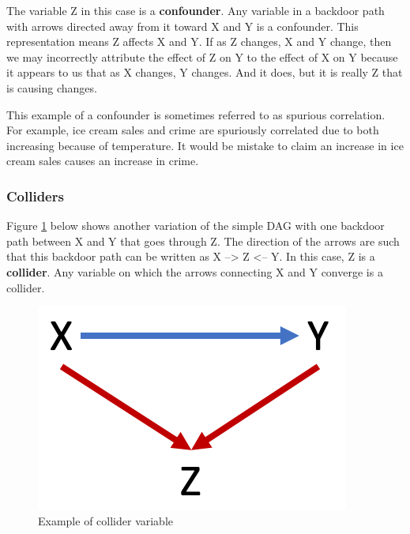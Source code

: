 \documentclass[
]{book}
\begin{document}
The variable Z in this case is a \textbf{confounder}. Any variable in a backdoor path with arrows directed away from it toward X and Y is a confounder. This representation means Z affects X and Y. If as Z changes, X and Y change, then we may incorrectly attribute the effect of Z on Y to the effect of X on Y because it appears to us that as X changes, Y changes. And it does, but it is really Z that is causing changes.

This example of a confounder is sometimes referred to as spurious correlation. For example, ice cream sales and crime are spuriously correlated due to both increasing because of temperature. It would be mistake to claim an increase in ice cream sales causes an increase in crime.

\hypertarget{colliders}{%
\subsubsection*{Colliders}\label{colliders}}

Figure \ref{fig:dagcoll} below shows another variation of the simple DAG with one backdoor path between X and Y that goes through Z. The direction of the arrows are such that this backdoor path can be written as X --\textgreater{} Z \textless-- Y. In this case, Z is a \textbf{collider}. Any variable on which the arrows connecting X and Y converge is a collider.

\begin{figure}

{\centering \includegraphics[width=\textwidth]{images/dag_collide} 

}

\caption{Example of collider variable}\label{fig:dagcoll}
\end{figure}
\end{document}
